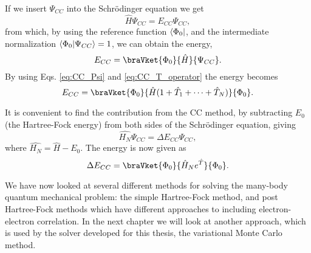 		If we insert $\Psi_{CC}$ into the Schrödinger equation we get
		\begin{equation}
			\hat{H}\Psi_{CC} = E_{CC}\Psi_{CC},
		\end{equation}
		from which, by using the reference function $\bra{\Phi_0}$, and the intermediate normalization $\bra{\Phi_0}\ket{\Psi_{CC}} = 1$, we can obtain the energy,
		\begin{equation}
			E_{CC} = \braVket{\Phi_0}{\hat{H}}{\Psi_{CC}}.
		\end{equation}
		By using Eqs. \eqref{eq:CC_Psi} and \eqref{eq:CC_T_operator} the energy becomes
		\begin{equation}
			E_{CC} = \braVket{\Phi_0}{\hat{H}(1+\hat{T}_1+\dots+\hat{T}_N)}{\Phi_{0}}.
		\end{equation}

		It is convenient to find the contribution from the CC method, by subtracting $E_0$ (the Hartree-Fock energy) from both sides of the Schrödinger equation, giving
		\begin{equation}
			\hat{H_N}\Psi_{CC} = \Delta E_{CC}\Psi_{CC},
		\end{equation}
		where $\hat{H_N} = \hat{H} - E_0$. The energy is now given as
		\begin{equation}
			\Delta E_{CC} = \braVket{\Phi_0}{\hat{H}_Ne^{\hat{T}}}{\Phi_{0}}.
		\end{equation}

		We have now looked at several different methods for solving the many-body quantum mechanical problem: the simple Hartree-Fock method, and post Hartree-Fock methods which have different approaches to including electron-electron correlation. In the next chapter we will look at another approach, which is used by the solver developed for this thesis, the variational Monte Carlo method.

